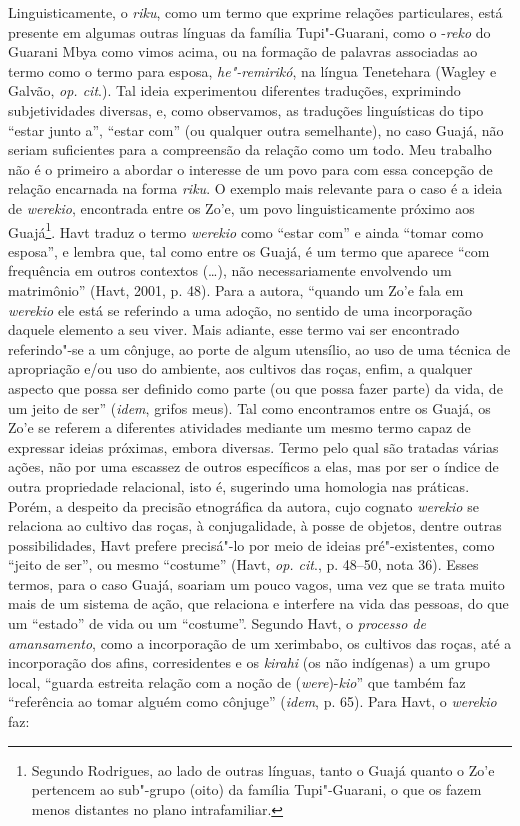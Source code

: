 Linguisticamente, o \emph{riku}, como um termo que exprime relações
particulares, está presente em algumas outras línguas da família
Tupi"-Guarani, como o -\emph{reko} do Guarani Mbya como vimos acima, ou
na formação de palavras associadas ao termo como o termo para esposa,
\emph{he"-remirikó}, na língua Tenetehara (Wagley e Galvão, \emph{op. cit}.).
Tal ideia experimentou diferentes traduções, exprimindo subjetividades
diversas, e, como observamos, as traduções linguísticas do tipo ``estar
junto a'', ``estar com'' (ou qualquer outra semelhante), no caso Guajá, não
seriam suficientes para a compreensão da relação como um todo. Meu
trabalho não é o primeiro a abordar o interesse de um povo para com essa
concepção de relação encarnada na forma \emph{riku}. O exemplo mais
relevante para o caso é a ideia de \emph{werekio}, encontrada entre os
Zo'e, um povo linguisticamente próximo aos Guajá\footnote{Segundo
  Rodrigues, ao lado de outras línguas, tanto o Guajá quanto o Zo'e
  pertencem ao sub"-grupo  (oito) da família Tupi"-Guarani, o que os
  fazem menos distantes no plano intrafamiliar.}. Havt traduz o termo
\emph{werekio} como ``estar com'' e ainda ``tomar como esposa'', e lembra
que, tal como entre os Guajá, é um termo que aparece ``com frequência em
outros contextos (\ldots{}), não necessariamente envolvendo um matrimônio''
(Havt, 2001, p. 48). Para a autora, ``quando um Zo'e fala em
\emph{werekio} ele está se referindo a uma adoção, no sentido de uma
incorporação daquele elemento a seu viver. Mais adiante, esse termo vai
ser encontrado referindo"-se a um cônjuge, ao porte de algum utensílio,
ao uso de uma técnica de apropriação e/ou uso do ambiente, aos cultivos
das roças, enfim, a qualquer aspecto que possa ser definido como parte
(ou que possa fazer parte) da vida, de um jeito de ser'' (\emph{idem}, grifos
meus). Tal como encontramos entre os Guajá, os Zo'e se referem a
diferentes atividades mediante um mesmo termo capaz de expressar ideias
próximas, embora diversas. Termo pelo qual são tratadas várias ações,
não por uma escassez de outros específicos a elas, mas por ser o índice
de outra propriedade relacional, isto é, sugerindo uma homologia nas
práticas. Porém, a despeito da precisão etnográfica da autora, cujo
cognato \emph{werekio} se relaciona ao cultivo das roças, à
conjugalidade, à posse de objetos, dentre outras possibilidades, Havt
prefere precisá"-lo por meio de ideias pré"-existentes, como ``jeito de
ser'', ou mesmo ``costume'' (Havt, \emph{op. cit}., p. 48--50, nota 36). Esses
termos, para o caso Guajá, soariam um pouco vagos, uma vez que se trata
muito mais de um sistema de ação, que relaciona e interfere na vida das
pessoas, do que um ``estado'' de vida ou um ``costume''. Segundo Havt, o
\emph{processo de amansamento}, como a incorporação de um xerimbabo, os
cultivos das roças, até a incorporação dos afins, corresidentes e os
\emph{kirahi} (os não indígenas) a um grupo local, ``guarda estreita
relação com a noção de (\emph{were})-\emph{kio}'' que também faz
``referência ao tomar alguém como cônjuge'' (\emph{idem}, p. 65). Para Havt, o
\emph{werekio} faz:

